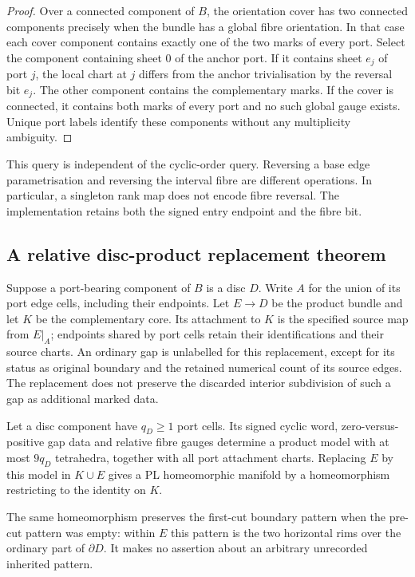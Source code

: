 \begin{proof}
Over a connected component of $B$, the orientation cover has two connected
components precisely when the bundle has a global fibre orientation.  In
that case each cover component contains exactly one of the two marks of
every port.  Select the component containing sheet $0$ of the anchor port.
If it contains sheet $e_j$ of port $j$, the local chart at $j$ differs from
the anchor trivialisation by the reversal bit $e_j$.  The other component
contains the complementary marks.  If the cover is connected, it contains
both marks of every port and no such global gauge exists.  Unique port
labels identify these components without any multiplicity ambiguity.
\end{proof}

This query is independent of the cyclic-order query.  Reversing a base edge
parametrisation and reversing the interval fibre are different operations.
In particular, a singleton rank map does not encode fibre reversal.  The
implementation retains both the signed entry endpoint and the fibre bit.

\subsection{A relative disc-product replacement theorem}

Suppose a port-bearing component of $B$ is a disc $D$.  Write $A$ for the
union of its port edge cells, including their endpoints.  Let $E\to D$ be
the product bundle and let $K$ be the complementary core.  Its attachment
to $K$ is the specified source map from $E|_A$; endpoints shared by port
cells retain their identifications and their source charts.
An ordinary gap is unlabelled for this replacement, except for its status
as original boundary and the retained numerical count of its source edges.
The replacement does not preserve the discarded interior subdivision of
such a gap as additional marked data.

\begin{theorem}
\label{thm:relative-disc-product-model}
Let a disc component have $q_D\geq1$ port cells.  Its signed cyclic word,
zero-versus-positive gap data and relative fibre gauges determine a product
model with at most $9q_D$ tetrahedra, together with all port attachment charts.
Replacing $E$ by this model in $K\cup E$ gives a PL homeomorphic manifold
by a homeomorphism restricting to the identity on $K$.

The same homeomorphism preserves the first-cut boundary pattern when the
pre-cut pattern was empty: within $E$ this pattern is the two horizontal
rims over the ordinary part of $\partial D$.  It makes no assertion about
an arbitrary unrecorded inherited pattern.
\end{theorem}

